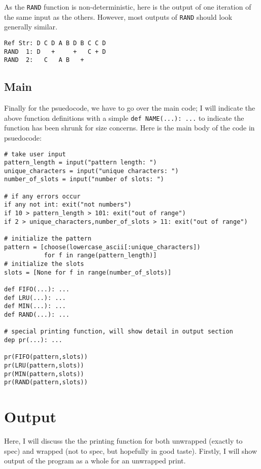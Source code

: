 \documentclass[11pt]{article}
\begin{document}
As the \texttt{RAND} function is non-deterministic, here is the output of one iteration of the same input as the others.
However, most outputs of \texttt{RAND} should look generally similar.

\begin{lstlisting}
Ref Str: D C D A B D B C C D
RAND  1: D   +     +   C + D
RAND  2:   C   A B   +
\end{lstlisting}

\subsection{Main}

Finally for the psuedocode, we have to go over the main code; I will indicate the above function definitions with a simple \texttt{def NAME(...): ...} to indicate the function has been shrunk for size concerns.
Here is the main body of the code in psuedocode:

\begin{lstlisting}
# take user input
pattern_length = input("pattern length: ")
unique_characters = input("unique characters: ")
number_of_slots = input("number of slots: ")

# if any errors occur
if any not int: exit("not numbers")
if 10 > pattern_length > 101: exit("out of range")
if 2 > unique_characters,number_of_slots > 11: exit("out of range")

# initialize the pattern
pattern = [choose(lowercase_ascii[:unique_characters])
           for f in range(pattern_length)]
# initialize the slots
slots = [None for f in range(number_of_slots)]

def FIFO(...): ...
def LRU(...): ...
def MIN(...): ...
def RAND(...): ...

# special printing function, will show detail in output section
dep pr(...): ...

pr(FIFO(pattern,slots))
pr(LRU(pattern,slots))
pr(MIN(pattern,slots))
pr(RAND(pattern,slots))

\end{lstlisting}

\section{Output}

Here, I will discuss the the printing function for both unwrapped (exactly to spec) and wrapped (not to spec, but hopefully in good taste).
Firstly, I will show output of the program as a whole for an unwrapped print.
\end{document}
